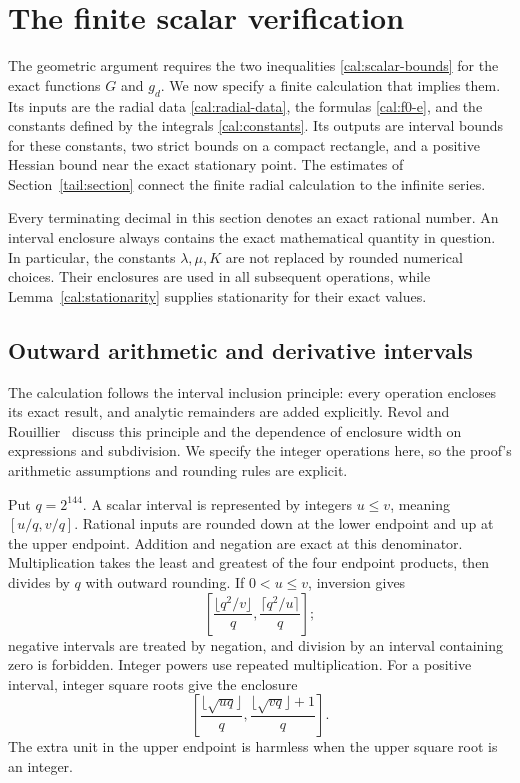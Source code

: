\section{The finite scalar verification}\label{sec:computation}

The geometric argument requires the two inequalities
\eqref{cal:scalar-bounds} for the exact functions $G$ and $g_d$.
We now specify a finite calculation that implies them.  Its inputs
are the radial data \eqref{cal:radial-data}, the formulas
\eqref{cal:f0-e}, and the constants defined by the integrals
\eqref{cal:constants}.  Its outputs are interval bounds for these
constants, two strict bounds on a compact rectangle, and a positive
Hessian bound near the exact stationary point.  The estimates of
Section~\ref{tail:section} connect the finite radial calculation to
the infinite series.

Every terminating decimal in this section denotes an exact rational
number.  An interval enclosure always contains the exact mathematical
quantity in question.  In particular, the constants $\lambda,\mu,K$
are not replaced by rounded numerical choices.  Their enclosures are
used in all subsequent operations, while
Lemma~\ref{cal:stationarity} supplies stationarity for their exact
values.

\subsection{Outward arithmetic and derivative intervals}
\label{comp:arithmetic}

The calculation follows the interval inclusion principle: every
operation encloses its exact result, and analytic remainders are added
explicitly. Revol and Rouillier~\cite{RevolRouillier2005} discuss this
principle and the dependence of enclosure width on expressions and
subdivision. We specify the integer operations here, so the proof's
arithmetic assumptions and rounding rules are explicit.

Put $q=2^{144}$.  A scalar interval is represented by integers
$u\le v$, meaning $[u/q,v/q]$.  Rational inputs are rounded down at
the lower endpoint and up at the upper endpoint.  Addition and
negation are exact at this denominator.  Multiplication takes the
least and greatest of the four endpoint products, then divides by
$q$ with outward rounding.  If $0<u\le v$, inversion gives
\[
 \left[\frac{\lfloor q^2/v\rfloor}{q},
       \frac{\lceil q^2/u\rceil}{q}\right];
\]
negative intervals are treated by negation, and division by an
interval containing zero is forbidden.  Integer powers use repeated
multiplication.  For a positive interval, integer square roots give
the enclosure
\[
 \left[\frac{\lfloor\sqrt{uq}\rfloor}{q},
       \frac{\lfloor\sqrt{vq}\rfloor+1}{q}\right].
\]
The extra unit in the upper endpoint is harmless when the upper
square root is an integer.

